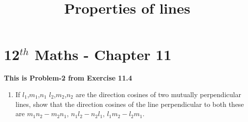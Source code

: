 \documentclass[12pt]{article}
\begin{document}
\begin{center}
\title{\textbf{Properties of lines}}
\date{\vspace{-5ex}} %
\maketitle
\end{center}
\setcounter{page}{1}
\section{12$^{th}$ Maths - Chapter 11}
\textbf{This is Problem-2 from Exercise 11.4}

\begin{enumerate}
\item If $l_1$,$m_1$,$n_1$  $l_2$,$m_2$,$n_2$ are the direction cosines of two mutually perpendicular lines, show that the direction cosines of the line perpendicular to both these are  $m_1n_2-m_2n_1$, $n_1l_2-n_2l_1$, $l_1m_2-l_2m_1$.


\end{enumerate}
\end{document}
